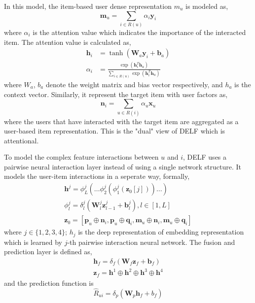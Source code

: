 In this model, the item-based user dense representation $m_u$ is modeled as,
\begin{equation}
    \mathbf{m}_{u}=\sum_{i \in R(u)} \alpha_{i} \mathbf{y}_{i}
\end{equation}
where $\alpha_{i}$ is the attention value which indicates the importance of
the interacted item. The attention value is calculated as,
\begin{equation}
    \begin{aligned} \mathbf{h}_{i} &=\tanh \left(\mathbf{W}_{a} \mathbf{y}_{i}+\mathbf{b}_{a}\right) \\ \alpha_{i} &=\frac{\exp \left(\mathbf{h}_{i}^{T} \mathbf{h}_{a}\right)}{\sum_{i \in R(u)} \exp \left(\mathbf{h}_{i}^{T} \mathbf{h}_{a}\right)} \end{aligned}
\end{equation}
where $W_a$, $b_a$ denote the weight matrix and bias vector respectively, and
$h_a$ is the context vector.
Similarly, it represent the target item with user factors as,
\begin{equation}
    \mathbf{n}_{i}=\sum_{u \in R(i)} \alpha_{u} \mathbf{x}_{u}
\end{equation}
where the users that have interacted with the target item are aggregated as
a user-based item representation. This is the "dual" view of DELF which is 
attentional.

To model the complex feature interactions between $u$ and $i$, DELF uses a 
pairwise neural interaction layer instead of using a single network structure.
It models the user-item interactions in a seperate way, formally,
\begin{equation}
\begin{array}{c}{\mathbf{h}^{j}=\phi_{L}^{j}\left(\ldots \phi_{2}^{j}\left(\phi_{1}^{j}\left(\mathbf{z}_{0}[j]\right)\right) \ldots\right)} \\ {\phi_{l}^{j}=\delta_{l}^{j}\left(\mathbf{W}_{l}^{j} \mathbf{z}_{l-1}^{j}+\mathbf{b}_{l}^{j}\right), l \in[1, L]} \\ {\mathbf{z}_{0}=\left[\mathbf{p}_{u} \oplus \mathbf{n}_{i}, \mathbf{p}_{u} \oplus \mathbf{q}_{i}, \mathbf{m}_{u} \oplus \mathbf{n}_{i}, \mathbf{m}_{u} \oplus \mathbf{q}_{i}\right]}\end{array}
\end{equation}
where $j \in \{1,2,3,4\}$; $h_j$ is the deep representation of embedding representation
which is learned by $j$-th pairwise interaction neural network.
The fusion and prediction layer is defined as,
\begin{equation}
\begin{array}{c}{\mathbf{h}_{f}=\delta_{f}\left(\mathbf{W}_{f} \mathbf{z}_{f}+\mathbf{b}_{f}\right)} \\ {\mathbf{z}_{f}=\mathbf{h}^{1} \oplus \mathbf{h}^{2} \oplus \mathbf{h}^{3} \oplus \mathbf{h}^{4}}\end{array}
\end{equation}
and the prediction function is
\begin{equation}
    \hat{R}_{u i}=\delta_{p}\left(\mathbf{W}_{p} \mathbf{h}_{f}+b_{f}\right)
\end{equation}


